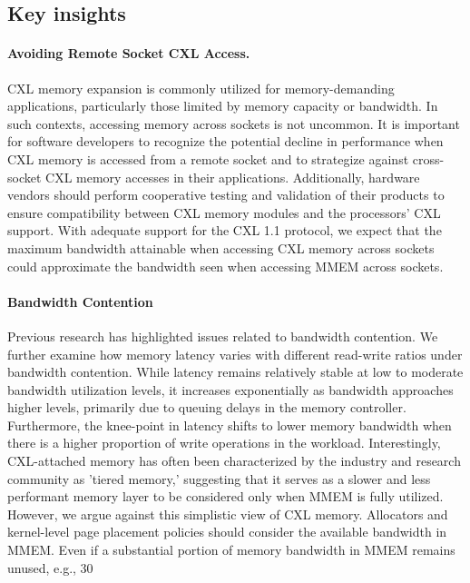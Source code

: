 \subsection{Key insights} \paragraph{Avoiding Remote Socket CXL Access.} CXL memory expansion is commonly utilized for memory-demanding applications, particularly those limited by memory capacity or bandwidth. In such contexts, accessing memory across sockets is not uncommon. It is important for software developers to recognize the potential decline in performance when CXL memory is accessed from a remote socket and to strategize against cross-socket CXL memory accesses in their applications. Additionally, hardware vendors should perform cooperative testing and validation of their products to ensure compatibility between CXL memory modules and the processors' CXL support. With adequate support for the CXL 1.1 protocol, we expect that the maximum bandwidth attainable when accessing CXL memory across sockets could approximate the bandwidth seen when accessing MMEM across sockets.

\paragraph{Bandwidth Contention} Previous research has highlighted issues related to bandwidth contention. We further examine how memory latency varies with different read-write ratios under bandwidth contention. While latency remains relatively stable at low to moderate bandwidth utilization levels, it increases exponentially as bandwidth approaches higher levels, primarily due to queuing delays in the memory controller. Furthermore, the knee-point in latency shifts to lower memory bandwidth when there is a higher proportion of write operations in the workload. Interestingly, CXL-attached memory has often been characterized by the industry and research community as 'tiered memory,' suggesting that it serves as a slower and less performant memory layer to be considered only when MMEM is fully utilized. However, we argue against this simplistic view of CXL memory. Allocators and kernel-level page placement policies should consider the available bandwidth in MMEM. Even if a substantial portion of memory bandwidth in MMEM remains unused, e.g., 30%

